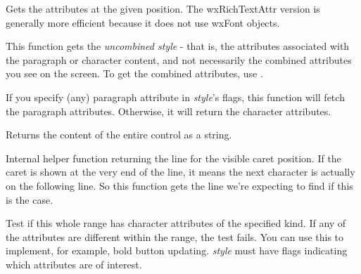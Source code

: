 Gets the attributes at the given position. The wxRichTextAttr version is generally more efficient
because it does not use wxFont objects.

This function gets the {\it uncombined style} - that is, the attributes associated with the
paragraph or character content, and not necessarily the combined attributes you see on the
screen. To get the combined attributes, use .

If you specify (any) paragraph attribute in {\it style}'s flags, this function will fetch
the paragraph attributes. Otherwise, it will return the character attributes.

\label{wxrichtextctrlgetvalue}


Returns the content of the entire control as a string.

\label{wxrichtextctrlgetvisiblelineforcaretposition}


Internal helper function returning the line for the visible caret position. If the caret is
shown at the very end of the line, it means the next character is actually
on the following line. So this function gets the line we're expecting to find
if this is the case.

\label{wxrichtextctrlhascharacterattributes}



Test if this whole range has character attributes of the specified kind. If any
of the attributes are different within the range, the test fails. You
can use this to implement, for example, bold button updating. {\it style} must have
flags indicating which attributes are of interest.

\label{wxrichtextctrlhasparagraphattributes}


